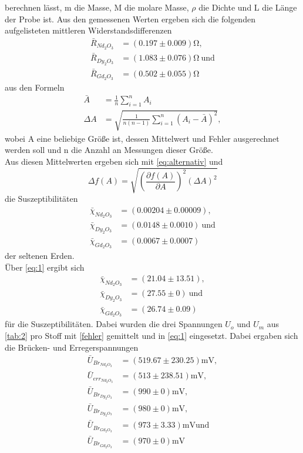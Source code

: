 berechnen lässt, m die Masse, M die molare Masse, $\rho$ die Dichte und L die Länge der Probe ist.
Aus den gemessenen Werten ergeben sich die folgenden aufgelisteten mittleren Widerstandsdifferenzen
\begin{align*}
  \bar R_{Nd_2 O_3}&=(0.197 \pm 0.009) \si{\ohm},\\
  \bar R_{Dy_2 O_3}&=(1.083 \pm 0.076) \si{\ohm}\ \textrm{und}\\
  \bar R_{Gd_2 O_3}&=(0.502 \pm 0.055) \si{\ohm}
\end{align*}
aus den Formeln
\begin{align*}
  \bar A&=\frac{1}{n}\sum_{i=1}^n A_i\\
  \Delta A&=\sqrt{\frac{1}{n(n-1)}\sum_{i=1}^n (A_i - \bar A)^2},
  \label{fehler}
\end{align*}
wobei A eine beliebige Größe ist, dessen Mittelwert und Fehler ausgerechnet werden soll und n die Anzahl an Messungen dieser Größe.\\
Aus diesen Mittelwerten ergeben sich mit \autoref{eq:alternativ} und    
\begin{equation}
  \Delta f(A)=\sqrt{\left(\frac{\partial f(A)}{\partial A}\right)^2 (\Delta A)^2}
  \label{gauß}
\end{equation}
die Suszeptibilitäten 
\begin{align*}
  \bar \chi_{Nd_2 O_3}&=(0.00204 \pm 0.00009),\\
  \bar \chi_{Dy_2 O_3}&=(0.0148 \pm 0.0010)\ \textrm{und}\\
  \bar \chi_{Gd_2 O_3}&=(0.0067 \pm 0.0007)
\end{align*}
der seltenen Erden.\\
Über \eqref{eq:1} ergibt sich 
\begin{align*}
  \bar \chi_{Nd_2 O_3}&=(21.04 \pm 13.51),\\
  \bar \chi_{Dy_2 O_3}&=(27.55 \pm 0)\ \textrm{und}\\
  \bar \chi_{Gd_2 O_3}&=(26.74 \pm 0.09)
\end{align*}
für die Suszeptibilitäten. Dabei wurden die drei Spannungen $U_{o}$ und $U_{m}$ aus \autoref{tab:2} pro Stoff mit \eqref{fehler} gemittelt und in \eqref{eq:1} eingesetzt. Dabei ergaben sich die Brücken- und Erregerspannungen
\begin{align*}
  \bar U_{Br_{Nd_2 O_3}}&=(519.67 \pm 230.25) \textrm{mV},\\
  \bar U_{err_{Nd_2 O_3}}&=(513 \pm 238.51) \textrm{mV},\\
  \bar U_{Br_{Dy_2 O_3}}&=(990 \pm 0) \textrm{mV},\\
  \bar U_{Br_{Dy_2 O_3}}&=(980 \pm 0) \textrm{mV},\\
  \bar U_{Br_{Gd_2 O_3}}&=(973 \pm 3.33) \textrm{mV} \textrm{und}\\
  \bar U_{Br_{Gd_2 O_3}}&=(970 \pm 0) \textrm{mV}
\end{align*}

